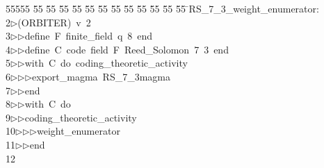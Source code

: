 %
%
\begin{tabbing}
55555 \= 55 \= 55 \= 55 \= 55 \= 55 \= 55 \= 55 \= 55 \= 55 \= 55 \= 55 \= 55 \= \>RS\_7\_3\_weight\_enumerator:\\[0pt]
2\>$\triangleright$\>(ORBITER)\ v\ 2\ \\[0pt]
3\>$\triangleright$\>$\triangleright$\>define\ F\ finite\_field\ q\ 8\ end\ \\[0pt]
4\>$\triangleright$\>$\triangleright$\>define\ C\ code\ field\ F\ Reed\_Solomon\ 7\ 3\ end\ \\[0pt]
5\>$\triangleright$\>$\triangleright$\>with\ C\ do\ coding\_theoretic\_activity\ \\[0pt]
6\>$\triangleright$\>$\triangleright$\>$\triangleright$\>export\_magma\ RS\_7\_3magma\ \\[0pt]
7\>$\triangleright$\>$\triangleright$\>end\ \\[0pt]
8\>$\triangleright$\>$\triangleright$\>with\ C\ do\ \\[0pt]
9\>$\triangleright$\>$\triangleright$\>coding\_theoretic\_activity\ \\[0pt]
10\>$\triangleright$\>$\triangleright$\>$\triangleright$\>weight\_enumerator\ \\[0pt]
11\>$\triangleright$\>$\triangleright$\>end\\[0pt]
12\>\end{tabbing}

